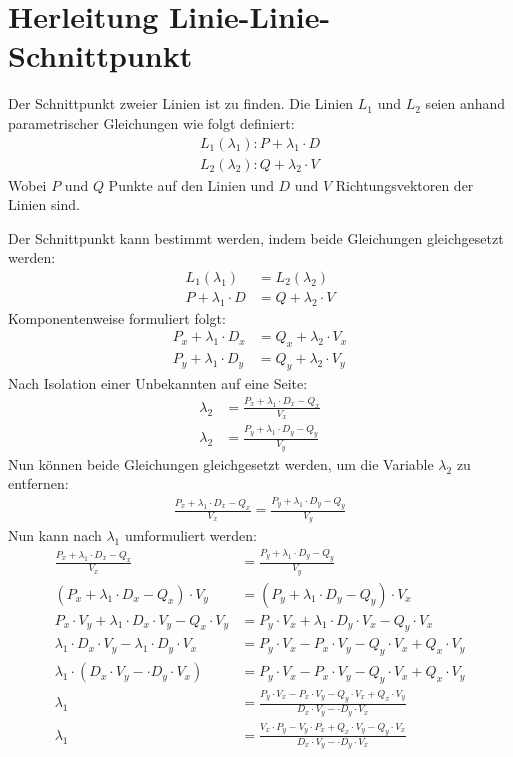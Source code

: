 \section{Herleitung Linie-Linie-Schnittpunkt}\label{anhang:herleitung:linie-linie-schnittpunkt}
Der Schnittpunkt zweier Linien ist zu finden. Die Linien $L_1$ und $L_2$ seien anhand parametrischer Gleichungen wie folgt definiert:
\begin{align}
    L_1(\lambda_1): P + \lambda_1 \cdot D\\
    L_2(\lambda_2): Q + \lambda_2 \cdot V
\end{align}
Wobei $P$ und $Q$ Punkte auf den Linien und $D$ und $V$ Richtungsvektoren der Linien sind.

Der Schnittpunkt kann bestimmt werden, indem beide Gleichungen gleichgesetzt werden:
\begin{align}
    L_1(\lambda_1) &= L_2(\lambda_2)\\
    P + \lambda_1 \cdot D &= Q + \lambda_2 \cdot V
\end{align}
Komponentenweise formuliert folgt:
\begin{align}
    P_x + \lambda_1 \cdot D_x &= Q_x + \lambda_2 \cdot V_x\\
    P_y + \lambda_1 \cdot D_y &= Q_y + \lambda_2 \cdot V_y
\end{align}
Nach Isolation einer Unbekannten auf eine Seite:
\begin{align}
    \lambda_2 &= \frac{P_x + \lambda_1 \cdot D_x - Q_x}{V_x}\label{eq:event_rail_collision_lambda_2x}\\
    \lambda_2 &= \frac{P_y + \lambda_1 \cdot D_y - Q_y}{V_y}\label{eq:event_rail_collision_lambda_2y}
\end{align}
Nun können beide Gleichungen gleichgesetzt werden, um die Variable $\lambda_2$ zu entfernen:
\begin{align}
    \frac{P_x + \lambda_1 \cdot D_x - Q_x}{V_x} = \frac{P_y + \lambda_1 \cdot D_y - Q_y}{V_y}
\end{align}
Nun kann nach $\lambda_1$ umformuliert werden:
\begin{align}
    \frac{P_x + \lambda_1 \cdot D_x - Q_x}{V_x} &= \frac{P_y + \lambda_1 \cdot D_y - Q_y}{V_y}\\
    (P_x + \lambda_1 \cdot D_x - Q_x) \cdot V_y &= (P_y + \lambda_1 \cdot D_y - Q_y) \cdot V_x\\
    P_x \cdot V_y + \lambda_1 \cdot D_x \cdot V_y - Q_x \cdot V_y &= P_y \cdot V_x + \lambda_1 \cdot D_y \cdot V_x - Q_y \cdot V_x\\
    \lambda_1 \cdot D_x \cdot V_y - \lambda_1 \cdot D_y \cdot V_x &= P_y \cdot V_x - P_x \cdot V_y - Q_y \cdot V_x + Q_x \cdot V_y\\
    \lambda_1 \cdot (D_x \cdot V_y - \cdot D_y \cdot V_x) &= P_y \cdot V_x - P_x \cdot V_y - Q_y \cdot V_x + Q_x \cdot V_y\\
    \lambda_1 &= \frac{P_y \cdot V_x - P_x \cdot V_y - Q_y \cdot V_x + Q_x \cdot V_y}{D_x \cdot V_y - \cdot D_y \cdot V_x}\\
    \lambda_1 &= \frac{V_x \cdot P_y - V_y \cdot P_x + Q_x \cdot V_y - Q_y \cdot V_x}{D_x \cdot V_y - \cdot D_y \cdot V_x}\label{eq:event_rail_collision_lambda1}
\end{align}

